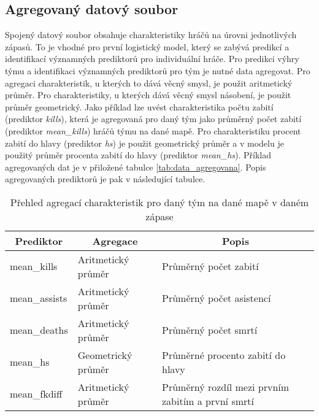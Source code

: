 \subsection{Agregovaný datový soubor} \label{sec:agregovany_datovy_soubor}
Spojený datový soubor obsahuje charakteristiky hráčů na úrovni jednotlivých zápasů. To je vhodné pro první logistický model, který se zabývá predikcí a identifikací
významných prediktorů pro individuální hráče. Pro predikci výhry týmu a identifikaci významných prediktorů pro tým je nutné data agregovat. Pro agregaci charakteristik, u kterých
to dává věcný smysl, je použit aritmetický průměr. Pro charakteristiky, u kterých dává věcný smysl násobení, je použit průměr geometrický. Jako příklad lze uvést charakteristika 
počtu zabití (prediktor \textit{kills}), která je agregovaná pro daný tým jako průměrný počet zabití (prediktor \textit{mean\_kills}) hráčů týmu na dané mapě. Pro charakteristiku
procent zabití do hlavy (prediktor \textit{hs}) je použit geometrický průměr a v modelu je použitý průměr procenta zabití do hlavy (prediktor \textit{mean\_hs}).
Příklad agregovaných dat je v přiložené tabulce \ref{tab:data_agregovana}. Popis agregovaných prediktorů je pak v následující tabulce.

\begin{table}[H]
    \centering
    \caption{Přehled agregací charakteristik pro daný tým na dané mapě v daném zápase}
    \begin{tabular}{|l|l|l|}
    \hline
    \multicolumn{1}{|c|}{Prediktor} & \multicolumn{1}{c|}{Agregace} & \multicolumn{1}{c|}{Popis}                        \\ \hline
    mean\_kills                     & Aritmetický průměr            & Průměrný počet zabití                             \\ \hline
    mean\_assists                   & Aritmetický průměr            & Průměrný počet asistencí                          \\ \hline
    mean\_deaths                    & Aritmetický průměr            & Průměrný počet smrtí                              \\ \hline
    mean\_hs                        & Geometrický průměr            & Průměrné procento zabití do hlavy                 \\ \hline
    mean\_fkdiff                    & Aritmetický průměr            & Průměrný rozdíl mezi prvním zabitím a první smrtí \\ \hline
    \end{tabular}
\end{table}

